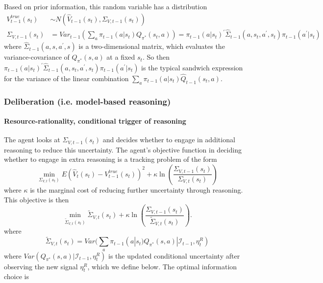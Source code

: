 \documentclass[12pt]{article}%
\begin{document}
Based on prior information, this random variable has a distribution%
\begin{align*}
V_{t-1}^{true}(s_{t})  &  \sim N(\widehat{V}_{t-1}(s_{t}),\Sigma_{V,t-1}%
(s_{t}))\\
\Sigma_{V,t-1}(s_{t})  &  = Var_{t-1}( \sum_{a}\pi_{t-1}(a|s_{t})Q_{\pi^{*}%
}(s_{t},a)) = \pi_{t-1}(a|s_{t})^{\prime}\widehat{\Sigma}_{t-1}(a,s_{t}%
,a^{\prime},s_{t}) \pi_{t-1}( a^{\prime}|s_{t})
\end{align*}
where $\widehat{\Sigma}_{t-1}(a,s,a^{\prime},s)$ is a two-dimensional matrix,
which evaluates the variance-covariance of $Q_{\pi^{*}}(s,a)$ at a fixed
$s_{t}$. So then $\pi_{t-1}(a|s_{t})^{\prime}\widehat{\Sigma}_{t-1}%
(a,s_{t},a^{\prime},s_{t}) \pi_{t-1}( a^{\prime}|s_{t})$ is the typical
sandwich expression for the variance of the linear combination $\sum_{a}%
\pi_{t-1}(a|s_{t})\widehat{Q}_{t-1}(s_{t},a)$.



\subsubsection{Deliberation (i.e. model-based reasoning)}

\paragraph{Resource-rationality, conditional trigger of reasoning}

The agent looks at $\Sigma_{V,t-1}(s_{t})$ and decides whether to engage in
additional reasoning to reduce this uncertainty. The agent's objective
function in deciding whether to engage in extra reasoning is a tracking
problem of the form
\[
\min_{\Sigma_{V,t}(s_{t})}E\left(  \widehat{V}_{t}(s_{t})-V_{t-1}^{true}%
(s_{t})\right)  ^{2}+\kappa\ln\left(  \frac{\Sigma_{V,t-1}(s_{t})}%
{\Sigma_{V,t}(s_{t})}\right)
\]
where $\kappa$ is the marginal cost of reducing further uncertainty through
reasoning. This objective is then%
\[
\min_{\widetilde{\Sigma}_{V,t}(s_{t})} \widetilde{\Sigma}_{V,t}(s_{t}%
)+\kappa\ln\left(  \frac{\Sigma_{V,t-1}(s_{t})}{\widetilde{\Sigma}_{V,t}%
(s_{t})}\right)  .
\]
where
\[
\widetilde{\Sigma}_{V,t}(s_{t})= Var(\sum_{a}\pi_{t-1}(a|s_{t}) Q_{\pi^{*}}
(s,a) | \mathcal{I}_{t-1}, \eta_{t}^{R})
\]
where $Var( Q_{\pi^{*}} (s,a) | \mathcal{I}_{t-1}, \eta_{t}^{R})$ is the
updated conditional uncertainty after observing the new signal $\eta_{t}^{R}$,
which we define below. The optimal information choice is%
\end{document}
